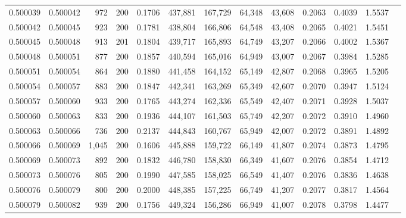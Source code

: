 \begin{tabular}{rrrrrrrrrrrrr}
0.500039 & 0.500042 &   972 & 200 &                                     0.1706 & 437,881 & 167,729 &  64,348 &  43,608 & 0.2063 & 0.4039 & 1.5537 \\
0.500042 & 0.500045 &   923 & 200 &                                     0.1781 & 438,804 & 166,806 &  64,548 &  43,408 & 0.2065 & 0.4021 & 1.5451 \\
0.500045 & 0.500048 &   913 & 201 &                                     0.1804 & 439,717 & 165,893 &  64,749 &  43,207 & 0.2066 & 0.4002 & 1.5367 \\
0.500048 & 0.500051 &   877 & 200 &                                     0.1857 & 440,594 & 165,016 &  64,949 &  43,007 & 0.2067 & 0.3984 & 1.5285 \\
0.500051 & 0.500054 &   864 & 200 &                                     0.1880 & 441,458 & 164,152 &  65,149 &  42,807 & 0.2068 & 0.3965 & 1.5205 \\
0.500054 & 0.500057 &   883 & 200 &                                     0.1847 & 442,341 & 163,269 &  65,349 &  42,607 & 0.2070 & 0.3947 & 1.5124 \\
0.500057 & 0.500060 &   933 & 200 &                                     0.1765 & 443,274 & 162,336 &  65,549 &  42,407 & 0.2071 & 0.3928 & 1.5037 \\
0.500060 & 0.500063 &   833 & 200 &                                     0.1936 & 444,107 & 161,503 &  65,749 &  42,207 & 0.2072 & 0.3910 & 1.4960 \\
0.500063 & 0.500066 &   736 & 200 &                                     0.2137 & 444,843 & 160,767 &  65,949 &  42,007 & 0.2072 & 0.3891 & 1.4892 \\
0.500066 & 0.500069 & 1,045 & 200 &                                     0.1606 & 445,888 & 159,722 &  66,149 &  41,807 & 0.2074 & 0.3873 & 1.4795 \\
0.500069 & 0.500073 &   892 & 200 &                                     0.1832 & 446,780 & 158,830 &  66,349 &  41,607 & 0.2076 & 0.3854 & 1.4712 \\
0.500073 & 0.500076 &   805 & 200 &                                     0.1990 & 447,585 & 158,025 &  66,549 &  41,407 & 0.2076 & 0.3836 & 1.4638 \\
0.500076 & 0.500079 &   800 & 200 &                                     0.2000 & 448,385 & 157,225 &  66,749 &  41,207 & 0.2077 & 0.3817 & 1.4564 \\
0.500079 & 0.500082 &   939 & 200 &                                     0.1756 & 449,324 & 156,286 &  66,949 &  41,007 & 0.2078 & 0.3798 & 1.4477 \\

\end{tabular}
